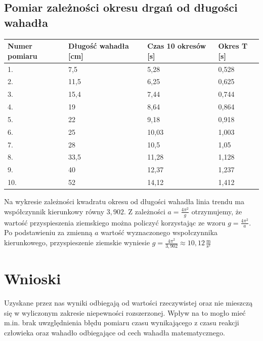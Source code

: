 \documentclass[a4paper,11pt]{article}
\begin{document}
\subsection{Pomiar zależności okresu drgań od długości wahadła}

\begin{table}[h]
\centering
\begin{tabular}{|l|l|l|l|}
\hline
Numer pomiaru & Długość wahadła {[}cm{]} &Czas 10 okresów {[}s{]} & Okres T {[}s{]} \\ \hline
1.            &7,5 & 5,28                    & 0,528                \\ \hline
2.            &11,5 & 6,25                    & 0,625                 \\ \hline
3.            &15,4 & 7,44                    & 0,744                 \\ \hline
4.            &19 & 8,64                    & 0,864                 \\ \hline
5.            &22 & 9,18                    & 0,918                 \\ \hline
6.            &25 & 10,03                    & 1,003                 \\ \hline
7.            &28 & 10,5                    & 1,05                 \\ \hline
8.            &33,5 & 11,28                    & 1,128                 \\ \hline
9.            &40 & 12,37                    & 1,237                 \\ \hline
10.           &52 & 14,12                    & 1,412                 \\ \hline
\end{tabular}
\end{table}
\begin{center}
\end{center}
Na wykresie zależności kwadratu okresu od długości wahadła linia trendu ma współczynnik kierunkowy równy $3{,}902$. Z zależności $a = \frac{4\pi^2}{g}$ otrzymujemy, że wartość przyspieszenia ziemskiego można policzyć korzystając ze wzoru $g = \frac{4\pi^2}{a}$. Po podstawieniu za zmienną $a$ wartość wyznaczonego wspołczynnika kierunkowego, przyspieszenie ziemskie wyniesie $g = \frac{4\pi^2}{3{,}902} \approx 10{,12}\, \frac{\textrm{m}}{\textrm{s}^2}$

\section{Wnioski}

Uzyskane przez nas wyniki odbiegają od wartości rzeczywistej oraz nie mieszczą się w wyliczonym zakresie niepewności rozszerzonej. Wpływ na to mogło mieć m.in. brak uwzględnienia błędu pomiaru czasu wynikającego z czasu reakcji człowieka oraz wahadło odbiegające od cech wahadła matematycznego.
\end{document}
